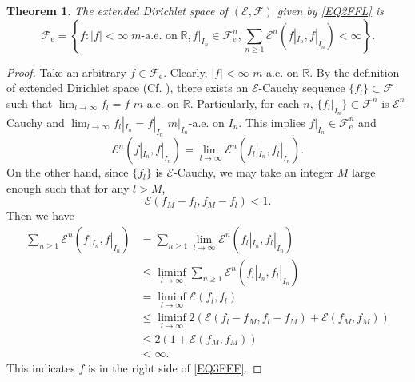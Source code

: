 \documentclass[a4paper]{amsart}
\newtheorem{theorem}{Theorem}[section]
\theoremstyle{definition}
\theoremstyle{remark}
\numberwithin{equation}{section}
\begin{document}
\begin{theorem}\label{LM31}
The extended Dirichlet space of $({{\mathcal{E}}},{{\mathcal{F}}})$ given by \eqref{EQ2FFL} is
\begin{equation}\label{EQ3FEF}
{{\mathcal{F}}}_\mathrm{e}=\left\{f: |f|<\infty\; m \text{-a.e. on}\; \mathbb{R}, f|_{I_n}\in {{\mathcal{F}}}^n_\mathrm{e}, \sum_{n\geq 1}{{\mathcal{E}}}^n(f|_{I_n}, f|_{I_n})<\infty  \right\}.
\end{equation}
\end{theorem}
\begin{proof}
Take an arbitrary $f\in {{\mathcal{F}}}_\mathrm{e}$. Clearly, $|f|<\infty$ $m$-a.e. on $\mathbb{R}$. By the definition of extended Dirichlet space (Cf. \cite[Definition~1.1.4]{CF12}), there exists an ${{\mathcal{E}}}$-Cauchy sequence $\{f_l\}\subset {{\mathcal{F}}}$ such that $\lim_{l\rightarrow \infty}f_l=f$ $m$-a.e. on $\mathbb{R}$. Particularly, for each $n$, $\{f_l|_{I_n}\}\subset {{\mathcal{F}}}^n$ is ${{\mathcal{E}}}^n$-Cauchy and $\lim_{l\rightarrow \infty}f_l|_{I_n}=f|_{I_n}$ $m|_{I_n}$-a.e. on $I_n$. This implies $f|_{I_n}\in {{\mathcal{F}}}^n_\mathrm{e}$ and
\[
	{{\mathcal{E}}}^n(f|_{I_n},f|_{I_n})=\lim_{l\rightarrow \infty} {{\mathcal{E}}}^n(f_l|_{I_n},f_l|_{I_n}).
\]
On the other hand, since $\{f_l\}$ is ${{\mathcal{E}}}$-Cauchy, we may take an integer $M$ large enough such that for any $l>M$,
\[
	{{\mathcal{E}}}(f_M-f_l, f_M-f_l)<1.
\]
Then we have
\[
\begin{aligned}
\sum_{n\geq 1}{{\mathcal{E}}}^n(f|_{I_n},f|_{I_n})&=\sum_{n\geq 1}\lim_{l\rightarrow \infty}{{\mathcal{E}}}^n(f_l|_{I_n},f_l|_{I_n}) \\
&\leq \liminf_{l\rightarrow \infty} \sum_{n\geq 1} {{\mathcal{E}}}^n(f_l|_{I_n}, f_l|_{I_n}) \\
&=\liminf_{l\rightarrow \infty} {{\mathcal{E}}}(f_l,f_l) \\
&\leq \liminf_{l\rightarrow \infty} 2\left( {{\mathcal{E}}}(f_l-f_M,f_l-f_M)+{{\mathcal{E}}}(f_M,f_M) \right) \\
&\leq 2\left(1+{{\mathcal{E}}}(f_M,f_M)\right) \\
&<\infty.
\end{aligned}
\]
This indicates $f$ is in the right side of \eqref{EQ3FEF}.


\end{proof}
\end{document}

